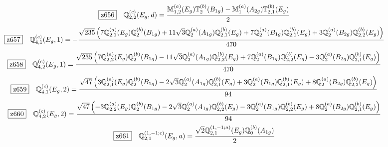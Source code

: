 \documentclass[fleqn,10pt,landscape]{jsarticle}
\begin{document}
\begin{dmath*}
\hspace*{3mm}\fbox{z656}\quad \mathbb{Q}_{2,2}^{(c)}(E_{g},d)=\frac{\mathbb{M}_{1,2}^{(a)}(E_{g}) \mathbb{T}_{2}^{(b)}(B_{1g}) - \mathbb{M}_{1}^{(a)}(A_{2g}) \mathbb{T}_{2,1}^{(b)}(E_{g})}{2}
\end{dmath*}
\begin{dmath*}
\hspace*{3mm}\fbox{z657}\quad \mathbb{Q}_{4,1}^{(c)}(E_{g},1)=- \frac{\sqrt{235} \left(7 \mathbb{Q}_{2,1}^{(a)}(E_{g}) \mathbb{Q}_{2}^{(b)}(B_{1g}) + 11 \sqrt{3} \mathbb{Q}_{2}^{(a)}(A_{1g}) \mathbb{Q}_{2,1}^{(b)}(E_{g}) + 7 \mathbb{Q}_{2}^{(a)}(B_{1g}) \mathbb{Q}_{2,1}^{(b)}(E_{g}) + 3 \mathbb{Q}_{2}^{(a)}(B_{2g}) \mathbb{Q}_{2,2}^{(b)}(E_{g})\right)}{470}
\end{dmath*}
\begin{dmath*}
\hspace*{3mm}\fbox{z658}\quad \mathbb{Q}_{4,2}^{(c)}(E_{g},1)=\frac{\sqrt{235} \left(7 \mathbb{Q}_{2,2}^{(a)}(E_{g}) \mathbb{Q}_{2}^{(b)}(B_{1g}) - 11 \sqrt{3} \mathbb{Q}_{2}^{(a)}(A_{1g}) \mathbb{Q}_{2,2}^{(b)}(E_{g}) + 7 \mathbb{Q}_{2}^{(a)}(B_{1g}) \mathbb{Q}_{2,2}^{(b)}(E_{g}) - 3 \mathbb{Q}_{2}^{(a)}(B_{2g}) \mathbb{Q}_{2,1}^{(b)}(E_{g})\right)}{470}
\end{dmath*}
\begin{dmath*}
\hspace*{3mm}\fbox{z659}\quad \mathbb{Q}_{4,1}^{(c)}(E_{g},2)=\frac{\sqrt{47} \left(3 \mathbb{Q}_{2,1}^{(a)}(E_{g}) \mathbb{Q}_{2}^{(b)}(B_{1g}) - 2 \sqrt{3} \mathbb{Q}_{2}^{(a)}(A_{1g}) \mathbb{Q}_{2,1}^{(b)}(E_{g}) + 3 \mathbb{Q}_{2}^{(a)}(B_{1g}) \mathbb{Q}_{2,1}^{(b)}(E_{g}) + 8 \mathbb{Q}_{2}^{(a)}(B_{2g}) \mathbb{Q}_{2,2}^{(b)}(E_{g})\right)}{94}
\end{dmath*}
\begin{dmath*}
\hspace*{3mm}\fbox{z660}\quad \mathbb{Q}_{4,2}^{(c)}(E_{g},2)=\frac{\sqrt{47} \left(- 3 \mathbb{Q}_{2,2}^{(a)}(E_{g}) \mathbb{Q}_{2}^{(b)}(B_{1g}) - 2 \sqrt{3} \mathbb{Q}_{2}^{(a)}(A_{1g}) \mathbb{Q}_{2,2}^{(b)}(E_{g}) - 3 \mathbb{Q}_{2}^{(a)}(B_{1g}) \mathbb{Q}_{2,2}^{(b)}(E_{g}) + 8 \mathbb{Q}_{2}^{(a)}(B_{2g}) \mathbb{Q}_{2,1}^{(b)}(E_{g})\right)}{94}
\end{dmath*}
\begin{dmath*}
\hspace*{3mm}\fbox{z661}\quad \mathbb{Q}_{2,1}^{(1,-1;c)}(E_{g},a)=\frac{\sqrt{2} \mathbb{Q}_{2,1}^{(1,-1;a)}(E_{g}) \mathbb{Q}_{0}^{(b)}(A_{1g})}{2}
\end{dmath*}
\end{document}
